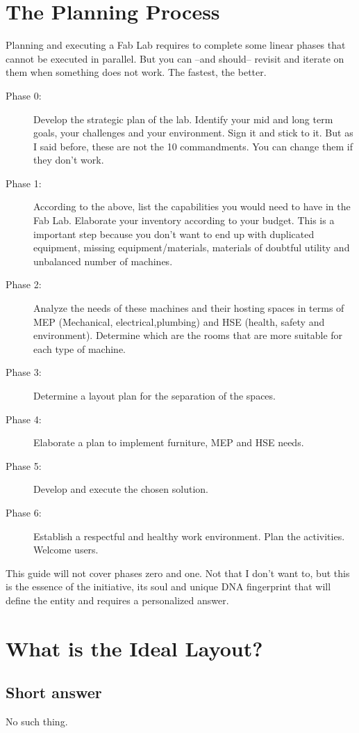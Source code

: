 \documentclass[a4paper,12pt,titlepage]{article}
\begin{document}
\section{The Planning Process}
Planning and executing a Fab Lab requires to complete some linear phases that cannot be executed in parallel. But you can --and should-- revisit and iterate on them when something does not work. The fastest, the better.
\begin{description}
\item[Phase 0:] Develop the strategic plan of the lab. Identify your mid and long term goals, your challenges and your environment. Sign it and stick to it. But as I said before, these are not the 10 commandments. You can change them if they don't work.
\item [Phase 1:] According to the above, list the capabilities you would need to have in the Fab Lab. Elaborate your inventory according to your budget. This is a important step because you don't want to end up with duplicated equipment, missing equipment/materials, materials of doubtful utility and unbalanced number of machines.

\item [Phase 2:] Analyze the needs of these machines and their hosting spaces in terms of MEP (Mechanical, electrical,plumbing) and HSE (health, safety and environment). Determine which are the rooms that are
more suitable for each type of machine.
\item [Phase 3:] Determine a layout plan for the separation of the spaces.
\item [Phase 4:] Elaborate a plan to implement furniture, MEP and HSE needs.
\item [Phase 5:] Develop and execute the chosen solution.
\item [Phase 6:] Establish a respectful and healthy work environment. Plan the activities. Welcome users.
\end{description}

This guide will not cover phases zero and one. Not that I don't want to, but this is the essence of the initiative, its soul and unique DNA fingerprint that will define the entity and requires a personalized answer.   

\section{What is the Ideal Layout?}
\subsection{Short answer} 
No such thing.
\end{document}
